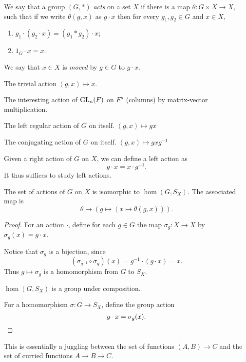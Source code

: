 
\begin{definition}[Action] \label{def:group:action}
    We say that a group $(G, *)$ \emph{acts} on a set $X$ if there is a map
    $\theta\colon G \times X \to X$, such that if we write $\theta(g, x)$
    as $g \cdot x$ then for every $g_1, g_2 \in G$ and $x \in X$,
    \begin{enumerate}
        \item $g_1 \cdot (g_2 \cdot x) = (g_1 * g_2) \cdot x$;
        \item $1_G \cdot x = x$.
    \end{enumerate}
    We say that $x \in X$ is \emph{moved} by $g \in G$ to $g \cdot x$.
\end{definition}
\begin{examples}
    \item The trivial action $(g, x) \mapsto x$.
    \item The interesting action of $\operatorname{GL}_n(F)$ on $F^n$ (columns)
        by matrix-vector multiplication.
    \item The left regular action of $G$ on itself.
        $(g, x) \mapsto gx$
    \item The conjugating action of $G$ on itself.
        $(g, x) \mapsto gxg^{-1}$
\end{examples}
\begin{remark}
    Given a right action of $G$ on $X$, we can define a left action as \[
        g \cdot x = x \cdot g^{-1}.
    \] It thus suffices to study left actions.
\end{remark}

\begin{proposition}
    The set of actions of $G$ on $X$ is isomorphic to $\hom(G, S_X)$.
    The associated map is \[
        \theta \mapsto (g \mapsto (x \mapsto \theta(g, x))).
    \]
\end{proposition}
\begin{proof}
    For an action $\cdot$, define for each $g \in G$ the map
    $\sigma_g\colon X \to X$ by $\sigma_g(x) = g \cdot x$.

    Notice that $\sigma_g$ is a bijection, since \[
        (\sigma_{g^{-1}} \circ \sigma_g)(x) = g^{-1} \cdot (g \cdot x) = x.
    \] Thus $g \mapsto \sigma_g$ is a homomorphism from $G$ to $S_X$.

    $\hom(G, S_X)$ is a group under composition.

    For a homomorphism $\sigma\colon G \to S_X$, define the group action \[
        g \cdot x = \sigma_g(x). \qedhere
    \]
\end{proof}
\begin{remark}
    This is essentially a juggling between the set of functions
    $(A, B) \to C$ and the set of curried functions $A \to B \to C$.
\end{remark}

